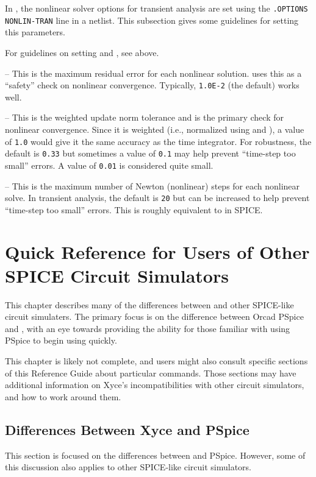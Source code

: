 In \Xyce{}, the nonlinear solver options for transient analysis are set using
the \texttt{.OPTIONS NONLIN-TRAN} line in a netlist.  This subsection gives
some guidelines for setting this parameters.
\begin{XyceItemize}
\item For guidelines on setting  and , see above.
\item {} -- This is the maximum residual error for each nonlinear
  solution.  \Xyce{} uses this as a ``safety'' check on nonlinear
  convergence.  Typically, \texttt{1.0E-2} (the default) works well.
\item {} -- This is the weighted update norm tolerance and is
  the primary check for nonlinear convergence.  Since it is weighted (i.e.,
  normalized using  and \mbox{}), a value of
  \texttt{1.0} would give it the same accuracy as the time integrator.  For
  robustness, the default is \texttt{0.33} but sometimes a value of
  \texttt{0.1} may help prevent ``time-step too small'' errors.  A value of
  \texttt{0.01} is considered quite small.
\item {} -- This is the maximum number of Newton (nonlinear)
  steps for each nonlinear solve.  In transient analysis, the default is
  \texttt{20} but can be increased to help prevent ``time-step too small''
  errors.  This is roughly equivalent to  in SPICE.
\end{XyceItemize}

\chapter{Quick Reference for Users of Other SPICE 
Circuit Simulators}
\label{PSpice_Ref}

This chapter describes many of the differences between \Xyce{} and
other SPICE-like circuit simulaters.  The primary focus is on the difference
between Orcad PSpice and \Xyce{}, with an eye towards providing the ability for those
familiar with using PSpice to begin using \Xyce{} quickly.  

This chapter is likely not complete, and \Xyce{} users might also consult
specific sections of this Reference Guide about particular \Xyce{} commands.
Those sections may have additional information on Xyce's incompatibilities with
other circuit simulators, and how to work around them.  

\section{Differences Between Xyce and PSpice}
This section is focused on the differences between \Xyce{} and PSpice.
However, some of this discussion also applies to other SPICE-like
circuit simulators. 


